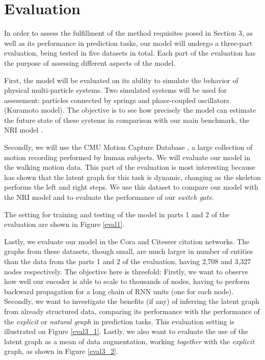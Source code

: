 \documentclass[12pt,a4paper]{article}
\begin{document}
	\section{Evaluation}
	\label{sec:Evaluation}
	
	In order to assess the fulfillment of the method requisites posed in Section 3, as well as its performance in prediction tasks, our model will undergo a three-part evaluation, being tested in five datasets in total. Each part of the evaluation has the purpose of assessing different aspects of the model.
	
	First, the model will be evaluated on its ability to simulate the behavior of physical multi-particle systems. Two simulated systems will be used for assessment: particles connected by springs and phase-coupled oscillators (Kuramoto model). The objective is to see how precisely the model can estimate the future state of these systems in comparison with our main benchmark, the NRI model \citep{KipfNRI2018}.
	
	Secondly, we will use the CMU Motion Capture Database \citep{CMU2003}, a large collection of motion recording performed by human subjects. We will evaluate our model in the walking motion data. This part of the evaluation is most interesting because \textcite{KipfNRI2018} has shown that the latent graph for this task is dynamic, changing as the skeleton performs the left and right steps. We use this dataset to compare our model with the NRI model and to evaluate the performance of our \emph{switch gate}.
	
	The setting for training and testing of the model in parts 1 and 2 of the evaluation are shown in Figure \ref{eval1}.
	
	Lastly, we evaluate our model in the Cora and Citeseer citation networks. The graphs from these datasets, though small, are much larger in number of entities than the data from the parts 1 and 2 of the evaluation, having 2,708 and 3,327 nodes respectively. The objective here is threefold: Firstly, we want to observe how well our encoder is able to scale to thousands of nodes, having to perform backward propagation for a long chain of RNN units (one for each node). Secondly, we want to investigate the benefits (if any) of inferring the latent graph from already structured data, comparing its performance with the performance of the \emph{explicit} or \emph{natural graph} in prediction tasks. This evaluation setting is illustrated on Figure \ref{eval3_1}. Lastly, we also want to evaluate the use of the latent graph as a mean of data augmentation, working \emph{together} with the \emph{explicit} graph, as shown in Figure \ref{eval3_2}.
	
\end{document}
